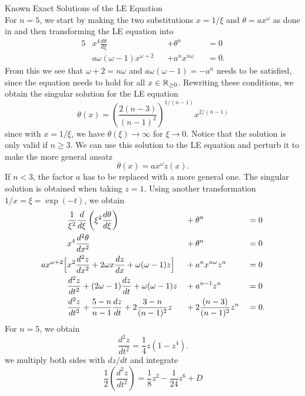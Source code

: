 \begin{appendix}
\begin{section}
\begin{subsection}{Known Exact Solutions of the LE Equation}
\begin{equation}
\end{equation}
For $n=5$, we start by making the two substitutions $x=1/\xi$ and $\theta=ax^\omega$ as done in \cite[94\psqq]{chandrasekharChandrasekharAnIntroductionStudy1958} and then transforming the LE equation into
\begin{alignat}{5}
	&x^4\frac{d\theta}{d\xi}&&+\theta^n&&=0\\
	&a\omega(\omega-1)x^{\omega+2}&&+a^nx^{n\omega} &&=0.
\end{alignat}
From this we see that $\omega+2=n\omega$ and $a\omega(\omega-1)=-a^n$ needs to be satisfied, since the equation needs to hold for all $x\in\mathbb{R}_{\geq0}$. Rewriting these conditions, we obtain the singular solution for the LE equation
\begin{equation}
	\theta(x) = \left(\frac{2(n-3)}{(n-1)^2}\right)^{1/(n-1)}x^{2/(n-1)}
\end{equation}
since with $x=1/\xi$, we have $\theta(\xi)\rightarrow\infty$ for $\xi\rightarrow0$. Notice that the solution is only valid if $n\geq3$. We can use this solution to the LE equation and perturb it to make the more general ansatz
\begin{equation}
	\theta(x) = ax^\omega z(x).
\end{equation}
If $n<3$, the factor $a$ has to be replaced with a more general one. The singular solution is obtained when taking $z=1$. Using another transformation $1/x=\xi=\exp(-t)$, we obtain
\begin{alignat}{5}
	&\frac{1}{\xi^2}\frac{d}{d\xi}\left(\xi^2\frac{d\theta}{d\xi}\right) &&+ \theta^n &&=0\\
	&x^4\frac{d^2\theta}{dx^2} &&+ \theta^n &&=0\\
	ax^{\omega+2}\Bigl[&x^2\frac{d^2z}{dx^2} + 2\omega x\frac{dz}{dx} + \omega(\omega-1)z\Bigr] &&+ a^nx^{n\omega}z^n &&=0\\
	&\frac{d^2z}{dt^2} + (2\omega-1)\frac{dz}{dt}+\omega(\omega-1)z &&+ a^{n-1}z^n &&=0\\
	&\frac{d^2z}{dt^2} + \frac{5-n}{n-1}\frac{dz}{dt} + 2\frac{3-n}{(n-1)^2}z &&+ 2\frac{(n-3)}{(n-1)^2}z^n &&=0.
\end{alignat}
For $n=5$, we obtain
\begin{equation}
	\frac{d^2z}{dt^2}=\frac{1}{4}z(1-z^4).
\end{equation}
we multiply both sides with $dz/dt$ and integrate
\begin{equation}
	\frac{1}{2}\left(\frac{d^2z}{dt^2}\right) = \frac{1}{8}z^2-\frac{1}{24}z^6+D
	\label{99-App-A-LE-For-n-5-In-z-writing}

\end{equation}
\end{subsection}
\end{section}
\end{appendix}
